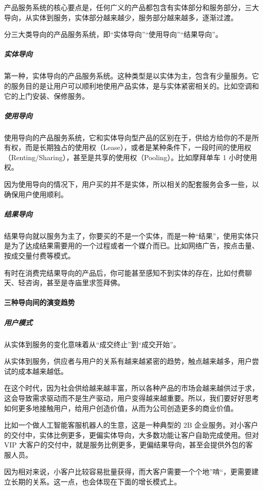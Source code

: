 \documentclass[letterpaper,10pt,english]{sphinxmanual}
\begin{document}
产品服务系统的核心要点是，任何广义的产品都包含有实体部分和服务部分，三大导向，从实体到服务，实体部分越来越少，服务部分越来越多，逐渐过渡。

分三大类导向的产品服务系统，即“实体导向”“使用导向”“结果导向”。


\subparagraph{实体导向}
\label{\detokenize{chapter_introduction/Product:id30}}
第一种，实体导向的产品服务系统。这种类型是以实体为主，包含有少量服务。它的服务目的是让用户可以顺利地使用产品实体，是与实体紧密相关的。比如空调和它的上门安装、保修服务。


\subparagraph{使用导向}
\label{\detokenize{chapter_introduction/Product:id31}}
使用导向的产品服务系统，它和实体导向型产品的区别在于，供给方给你的不是所有权，而是长期独占的使用权（Lease），或者是某种条件下，一段时间的使用权（Renting/Sharing），甚至是共享的使用权（Pooling）。比如摩拜单车
1 小时使用权。

因为使用导向的情况下，用户买的并不是实体，所以相关的配套服务会多一些，以确保用户使用顺利。


\subparagraph{结果导向}
\label{\detokenize{chapter_introduction/Product:id32}}
结果导向就以服务为主了，你要买的不是一个实体，而是一种“结果”，使用实体只是为了达成结果需要用的一个过程或者一个媒介而已。比如网络广告，按点击量、按成交量付费等模式。

有时在消费完结果导向的产品后，你可能甚至感知不到实体的存在，比如付费聊天、轻咨询，甚至是寺庙里求签拜佛。


\paragraph{三种导向间的演变趋势}
\label{\detokenize{chapter_introduction/Product:id33}}

\subparagraph{用户模式}
\label{\detokenize{chapter_introduction/Product:id34}}
从实体到服务的变化意味着从“成交终止”到“成交开始”。

从实体到服务，供应者与用户的关系有越来越紧密的趋势，触点越来越多，用户尝试的成本越来越低。

在这个时代，因为社会供给越来越丰富，所以各种产品的市场会越来越供过于求，这会导致需求驱动而不是生产驱动，用户变得越来越重要。所以，我们要好好思考如何更多地接触用户，给用户创造价值，从而为公司创造更多的商业价值。

比如一个做人工智能客服机器人的生意，这是一种典型的 2B
企业服务。对小客户的交付中，实体比例更多，更偏实体导向，大多数功能让客户自助完成使用。但对
VIP
大客户的交付中，就是服务比例更多，更偏结果导向，甚至会提供外包的客服人员。

因为相对来说，小客户比较容易批量获得，而大客户需要一个个地”啃“，更需要建立长期的关系。这一点，也会体现在下面的增长模式上。
\end{document}
